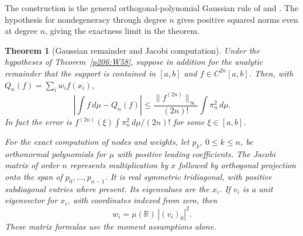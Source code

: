 \documentclass[11pt,oneside,openany]{book}
\theoremstyle{plain}
\newtheorem{theorem}{Theorem}[chapter]
\theoremstyle{definition}
\theoremstyle{remark}
\begin{document}
The construction is the general orthogonal-polynomial Gaussian
rule of \cite[Section 4.1]{gautschi} and
\cite[Section 3.6]{stoer}. The hypothesis for nondegeneracy
through degree \(n\) gives positive squared norms even at degree
\(n\), giving the exactness limit in the theorem.

\begin{theorem}[Gaussian remainder and Jacobi computation]\label{p206:W59}
Under the hypotheses of Theorem~\ref{p206:W58}, suppose in addition
for the analytic remainder that the support is contained in
\([a,b]\) and \(f\in C^{2n}[a,b]\). Then, with
\(Q_n(f)=\sum_iw_i f(x_i)\),
\[
 \left|\int f\,d\mu-Q_n(f)\right|
 \le\frac{\lVert f^{(2n)}\rVert_\infty}{(2n)!}
          \int \pi_n^2\,d\mu .
\]
In fact the error is \(f^{(2n)}(\xi)\int\pi_n^2\,d\mu/(2n)!\)
for some \(\xi\in[a,b]\).

For the exact computation of nodes and weights, let \(p_k\),
\(0\le k\le n\), be orthonormal polynomials for \(\mu\) with
positive leading coefficients. The Jacobi matrix of order \(n\)
represents multiplication by \(x\) followed by orthogonal
projection onto the span of \(p_0,\ldots,p_{n-1}\). It is real
symmetric tridiagonal, with positive subdiagonal entries where
present. Its eigenvalues are the \(x_i\). If \(v_i\) is a unit
eigenvector for \(x_i\), with coordinates indexed from zero, then
\[
 w_i=\mu(\mathbb R)\,|(v_i)_0|^2.
\]
These matrix formulas use the moment assumptions alone.
\end{theorem}
\end{document}
